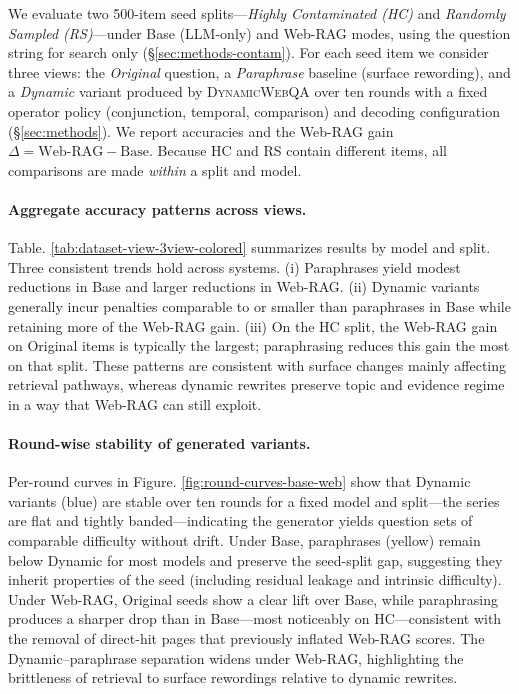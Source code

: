 We evaluate two 500-item seed splits—\emph{Highly Contaminated (HC)} and \emph{Randomly Sampled (RS)}—under Base (LLM-only) and Web-RAG modes, using the question string for search only (\S\ref{sec:methods-contam}). For each seed item we consider three views: the \emph{Original} question, a \emph{Paraphrase} baseline (surface rewording), and a \emph{Dynamic} variant produced by \textsc{DynamicWebQA} over ten rounds with a fixed operator policy (conjunction, temporal, comparison) and decoding configuration (\S\ref{sec:methods}). We report accuracies and the Web-RAG gain $\Delta=\text{Web-RAG}-\text{Base}$. Because HC and RS contain different items, all comparisons are made \emph{within} a split and model.

\paragraph{Aggregate accuracy patterns across views.}
Table. \ref{tab:dataset-view-3view-colored} summarizes results by model and split. Three consistent trends hold across systems. (i) Paraphrases yield modest reductions in Base and larger reductions in Web-RAG. (ii) Dynamic variants generally incur penalties comparable to or smaller than paraphrases in Base while retaining more of the Web-RAG gain. (iii) On the HC split, the Web-RAG gain on Original items is typically the largest; paraphrasing reduces this gain the most on that split. These patterns are consistent with surface changes mainly affecting retrieval pathways, whereas dynamic rewrites preserve topic and evidence regime in a way that Web-RAG can still exploit.

\paragraph{Round-wise stability of generated variants.}
Per-round curves in Figure. \ref{fig:round-curves-base-web} show that Dynamic variants (blue) are stable over ten rounds for a fixed model and split—the series are flat and tightly banded—indicating the generator yields question sets of comparable difficulty without drift. Under Base, paraphrases (yellow) remain below Dynamic for most models and preserve the seed-split gap, suggesting they inherit properties of the seed (including residual leakage and intrinsic difficulty). Under Web-RAG, Original seeds show a clear lift over Base, while paraphrasing produces a sharper drop than in Base—most noticeably on HC—consistent with the removal of direct-hit pages that previously inflated Web-RAG scores. The Dynamic–paraphrase separation widens under Web-RAG, highlighting the brittleness of retrieval to surface rewordings relative to dynamic rewrites.


